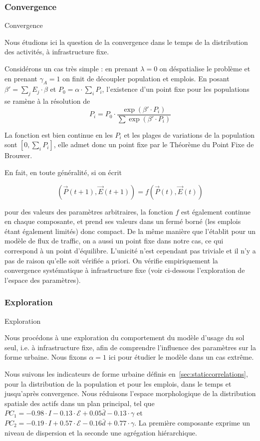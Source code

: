 \subsubsection{Convergence}{Convergence}

Nous étudions ici la question de la convergence dans le temps de la distribution des activités, à infrastructure fixe.

Considérons un cas très simple : en prenant $\lambda = 0$ on déspatialise le problème et en prenant $\gamma_A = 1$ on finit de découpler population et emplois. En posant $\beta' = \sum_j E_j \cdot \beta$ et $P_0 = \alpha \cdot \sum_i P_i$, l'existence d'un point fixe pour les populations se ramène à la résolution de
\[
P_i = P_0 \cdot \frac{\exp\left(\beta' \cdot P_i\right)}{\sum \exp\left(\beta' \cdot P_i\right)}
\]

La fonction est bien continue en les $P_i$ et les plages de variations de la population sont $[0,\sum_i P_i]$, elle admet donc un point fixe par le Théorème du Point Fixe de Brouwer. 

En fait, en toute généralité, si on écrit

\[
(\vec{P}(t+1),\vec{E}(t+1)) = f(\vec{P}(t),\vec{E}(t))
\]

pour des valeurs des paramètres arbitraires, la fonction $f$ est également continue en chaque composante, et prend ses valeurs dans un fermé borné (les emplois étant également limités) donc compact. De la même manière que \cite{leurent2014user} l'établit pour un modèle de flux de traffic, on a aussi un point fixe dans notre cas, ce qui correspond à un point d'équilibre. L'unicité n'est cependant pas triviale et il n'y a pas de raison qu'elle soit vérifiée a priori. On vérifie empiriquement la convergence systématique à infrastructure fixe (voir ci-dessous l'exploration de l'espace des paramètres).


\subsubsection{Exploration}{Exploration}


Nous procédons à une exploration du comportement du modèle d'usage du sol seul, i.e. à infrastructure fixe, afin de comprendre l'influence des paramètres sur la forme urbaine. Nous fixons $\alpha = 1$ ici pour étudier le modèle dans un cas extrême.

Nous suivons les indicateurs de forme urbaine définis en~\ref{sec:staticcorrelations}, pour la distribution de la population et pour les emplois, dans le temps et jusqu'après convergence. Nous réduisons l'espace morphologique de la distribution spatiale des actifs dans un plan principal, tel que $PC_1 = -0.98 \cdot I - 0.13 \cdot \mathcal{E} + 0.05 \bar{d} - 0.13 \cdot \gamma $ et $PC_2 = -0.19 \cdot I + 0.57 \cdot \mathcal{E} - 0.16 \bar{d} + 0.77 \cdot \gamma $. La première composante exprime un niveau de dispersion et la seconde une agrégation hiérarchique.


